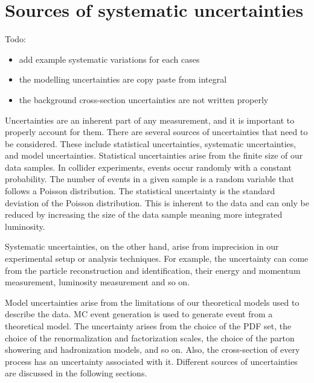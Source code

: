 \chapter{Sources of systematic uncertainties}
\label{sec:sources-of-uncertainties}
Todo: 
\begin{itemize}
    \item add example systematic variations for each cases 
    \item the modelling uncertainties are copy paste from integral
    \item the background cross-section uncertainties are not written properly
\end{itemize}
Uncertainties are an inherent part of any measurement, and it is important to properly account for them. There are several sources of uncertainties that need to be considered. These include statistical uncertainties, systematic uncertainties, and model uncertainties. Statistical uncertainties arise from the finite size of our data samples. In collider experiments, events occur randomly with a constant probability. The number of events in a given sample is a random variable that follows a Poisson distribution. The statistical uncertainty is the standard deviation of the Poisson distribution. This is inherent to the data and can only be reduced by increasing the size of the data sample meaning more integrated luminosity.

Systematic uncertainties, on the other hand, arise from imprecision in our experimental setup or analysis techniques. For example, the uncertainty can come from the particle reconstruction and identification, their energy and momentum measurement, luminosity measurement and so on.

Model uncertainties arise from the limitations of our theoretical models used to describe the data. MC event generation is used to generate event from a theoretical model. The uncertainty arises from the choice of the PDF set, the choice of the renormalization and factorization scales, the choice of the parton showering and hadronization models, and so on. Also, the cross-section of every process has an uncertainty associated with it. Different sources of uncertainties are discussed in the following sections. 

